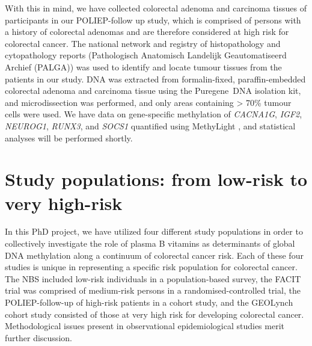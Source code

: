 \noindent With this in mind, we have collected colorectal adenoma and carcinoma tissues of participants in our POLIEP-follow up study, which is comprised of persons with a history of colorectal adenomas and are therefore considered at high risk for colorectal cancer. The national network and registry of histopathology and cytopathology reports (Pathologisch Anatomisch Landelijk Geautomatiseerd Archief (PALGA)) \cite{c762} was used to identify and locate tumour tissues from the patients in our study. DNA was extracted from formalin-fixed, paraffin-embedded colorectal adenoma and carcinoma tissue using the Puregene\texttrademark~DNA isolation kit, and microdissection was performed, and only areas containing > 70\% tumour cells were used. We have data on gene-specific methylation of \emph{CACNA1G}, \emph{IGF2}, \emph{NEUROG1}, \emph{RUNX3}, and \emph{SOCS1} quantified using MethyLight \cite{c763}, and statistical analyses will be performed shortly. 
 
\section{Study populations: from low-risk to very high-risk} %
\noindent In this PhD project, we have utilized four different study populations in order to collectively investigate the role of plasma B vitamins as determinants of global DNA methylation along a continuum of colorectal cancer risk. Each of these four studies is unique in representing a specific risk population for colorectal cancer. The NBS included low-risk individuals in a population-based survey, the FACIT trial was comprised of medium-risk persons in a randomised-controlled trial, the POLIEP-follow-up of high-risk patients in a cohort study, and the GEOLynch cohort study consisted of those at very high risk for developing colorectal cancer. Methodological issues present in observational epidemiological studies merit further discussion. 
 
